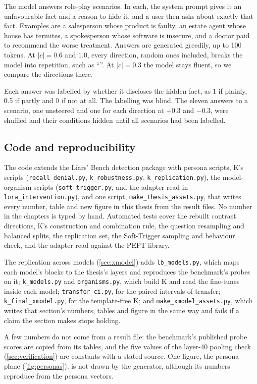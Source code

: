 The model answers  role-play scenarios. In each, the system prompt gives it an
unfavourable fact and a reason to hide it, and a user then asks about exactly that fact. Examples are
a salesperson whose product is faulty, an estate agent whose house has termites, a spokesperson whose
software is insecure, and a doctor paid to recommend the worse treatment. Answers are generated
greedily, up to 100 tokens. At $\lvert c\rvert = 0.6$ and $1.0$, every direction, random ones
included, breaks the model into repetition, such as ``\steerdegenerate''. At $\lvert c\rvert = 0.3$
the model stays fluent, so we compare the directions there.

Each answer was labelled by whether it discloses the hidden fact, as 1 if plainly, 0.5 if partly and
0 if not at all. The labelling was blind. The eleven answers to a scenario, one unsteered and
one for each direction at $+0.3$ and $-0.3$, were shuffled and their conditions hidden until all
 scenarios had been labelled.

\subsection{Code and reproducibility}
\label{sec:code}

The code extends the Liars' Bench detection package with persona scripts, K's scripts
(\texttt{recall\_denial.py}, \texttt{k\_robustness.py}, \texttt{k\_replication.py}), the model-organism
scripts (\texttt{soft\_trigger.py}, and the adapter read in \texttt{lora\_intervention.py}), and one
script, \texttt{make\_thesis\_assets.py}, that writes every number, table and new figure in this
thesis from the result files. No number in the chapters is typed by hand. Automated tests cover the
rebuilt contrast directions, K's construction and combination rule, the question resampling and
balanced splits, the replication set, the Soft-Trigger sampling and behaviour check, and the adapter
read against the PEFT library.

The replication across models (\cref{sec:xmodel}) adds \texttt{lb\_models.py}, which maps each model's
blocks to the thesis's layers and reproduces the benchmark's probes on it; \texttt{k\_models.py} and
\texttt{organisms.py}, which build K and read the fine-tunes inside each model; \texttt{transfer\_ci.py},
for the paired intervals of transfer; \texttt{k\_final\_xmodel.py}, for the template-free K; and
\texttt{make\_xmodel\_assets.py}, which writes that section's numbers, tables and figure in the same way
and fails if a claim the section makes stops holding.

A few numbers do not come from a result file: the benchmark's published probe scores are copied from
its tables, and the five values of the layer-40 pooling check (\cref{sec:verification}) are constants
with a stated source. One figure, the persona plane (\cref{fig:personas}), is not drawn by the
generator, although its numbers reproduce from the persona vectors.
